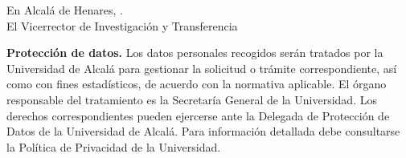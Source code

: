 \documentclass[11pt,a4paper,oneside]{article}
\begin{document}
\vfill\begin{flushright}En Alcalá de Henares, \myPaperworkDate.\\[1.5cm]
El Vicerrector de Investigación y Transferencia\\
\myResearchVicerrector
\end{flushright}
\vfill
{\scriptsize
\noindent\textbf{Protección de datos.} Los datos personales recogidos serán tratados por la Universidad de Alcalá para gestionar la solicitud o trámite correspondiente, así como con fines estadísticos, de acuerdo con la normativa aplicable. El órgano responsable del tratamiento es la Secretaría General de la Universidad. Los derechos correspondientes pueden ejercerse ante la Delegada de Protección de Datos de la Universidad de Alcalá. Para información detallada debe consultarse la Política de Privacidad de la Universidad.
}
\end{document}
